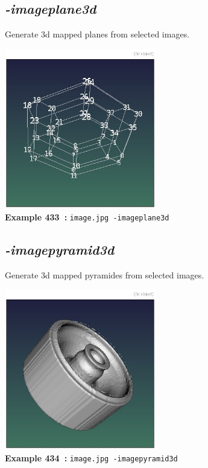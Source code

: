 \documentclass[a4paper,11pt,twoside]{book}
\begin{document}
\subsection{\emph{-imageplane3d} }\vspace*{-0.5em}
Generate 3d mapped planes from selected images.
\begin{center}\includegraphics[keepaspectratio=true,height=7cm,width=\textwidth]{img/gmic_def433.jpg}\\
{\footnotesize \textbf{Example 433~:} \texttt{image.jpg -imageplane3d}}
\end{center}

\subsection{\emph{-imagepyramid3d} }\vspace*{-0.5em}
Generate 3d mapped pyramides from selected images.
\begin{center}\includegraphics[keepaspectratio=true,height=7cm,width=\textwidth]{img/gmic_def434.jpg}\\
{\footnotesize \textbf{Example 434~:} \texttt{image.jpg -imagepyramid3d}}
\end{center}
\end{document}
